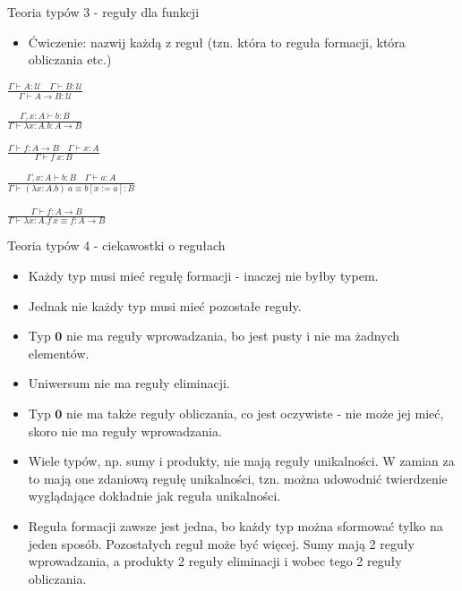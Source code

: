 \documentclass{beamer}
\newcommand{\U}{\mathcal{U}}
\begin{document}
\begin{frame}{Teoria typów 3 - reguły dla funkcji}

\begin{itemize}
	\item Ćwiczenie: nazwij każdą z reguł (tzn. która to reguła formacji, która obliczania etc.)
\end{itemize}

	\begin{center}
		$\displaystyle \frac{\Gamma \vdash A : \U \quad \Gamma \vdash B : \U}{\Gamma \vdash A \to B : \U}$
	\end{center}
	\begin{center}
		$\displaystyle \frac{\Gamma, x : A \vdash b : B}{\Gamma \vdash \lambda x:A.b : A \to B}$
	\end{center}
	\begin{center}
		$\displaystyle \frac{\Gamma \vdash f : A \to B \quad \Gamma \vdash x : A}{\Gamma \vdash f\ x : B}$
	\end{center}
	\begin{center}
		$\displaystyle \frac{\Gamma, x : A \vdash b : B \quad \Gamma \vdash a : A}{\Gamma \vdash (\lambda x:A.b)\ a \equiv b[x := a] : B}$
	\end{center}
	\begin{center}
		$\displaystyle \frac{\Gamma \vdash f : A \to B}{\Gamma \vdash \lambda x:A.f\ x \equiv f : A \to B}$
	\end{center}
\end{frame}

\begin{frame}{Teoria typów 4 - ciekawostki o regułach}
\begin{itemize}
	\item Każdy typ musi mieć regułę formacji - inaczej nie byłby typem.
	\item Jednak nie każdy typ musi mieć pozostałe reguły.
	\item Typ $\mathbf{0}$ nie ma reguły wprowadzania, bo jest pusty i nie ma żadnych elementów.
	\item Uniwersum nie ma reguły eliminacji.
	\item Typ $\mathbf{0}$ nie ma także reguły obliczania, co jest oczywiste - nie może jej mieć, skoro nie ma reguły wprowadzania.
	\item Wiele typów, np. sumy i produkty, nie mają reguły unikalności. W zamian za to mają one zdaniową regułę unikalności, tzn. można udowodnić twierdzenie wyglądające dokładnie jak reguła unikalności.
	\item Reguła formacji zawsze jest jedna, bo każdy typ można sformować tylko na jeden sposób. Pozostałych reguł może być więcej. Sumy mają 2 reguły wprowadzania, a produkty 2 reguły eliminacji i wobec tego 2 reguły obliczania.
\end{itemize}
\end{frame}
\end{document}

